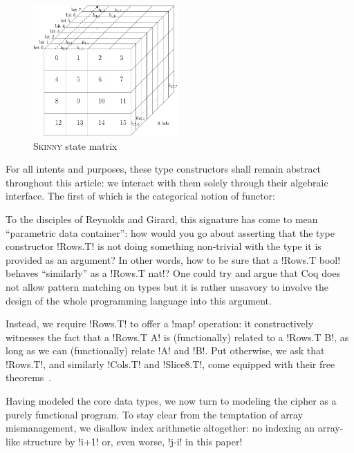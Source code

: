 \documentclass[draft,english]{jflart}
\newcommand{\Skinny}{\textsc{Skinny}}
\begin{document}
\begin{figure}
  \begin{center}
    \includegraphics[draft=false,height=5cm]{skinny_state}
  \end{center}
  \caption{\Skinny{} state matrix}
  \label{fig:state}
\end{figure}



For all intents and purposes, these type constructors shall remain
abstract throughout this article: we interact with them solely through
their algebraic interface. The first of which is the categorical
notion of functor:
%

To the disciples of Reynolds and Girard, this signature has come to
mean ``parametric data container'': how would you go about asserting
that the type constructor \coqe!Rows.T! is not doing something
non-trivial with the type it is provided as an argument? In other
words, how to be sure that a \coqe!Rows.T bool! behaves ``similarly''
as a \coqe!Rows.T nat!? One could try and argue that Coq does not
allow pattern matching on types but it is rather unsavory to involve
the design of the whole programming language into this argument.

Instead, we require \coqe!Rows.T! to offer a \coqe!map! operation: it
constructively witnesses the fact that a \coqe!Rows.T A! is
(functionally) related to a \coqe!Rows.T B!, as long as we can
(functionally) relate \coqe!A! and \coqe!B!. Put otherwise, we ask
that \coqe!Rows.T!, and similarly \coqe!Cols.T! and \coqe!Slice8.T!,
come equipped with their free theorems~\citep{reynolds:parametricity,
  wadler:free-theorem}.


Having modeled the core data types, we now turn to modeling the cipher
as a purely functional program. To stay clear from the temptation of
array mismanagement, we disallow index arithmetic altogether: no
indexing an array-like structure by \coqe!i+1! or, even worse,
\coqe!j-i! in this paper!
\end{document}
